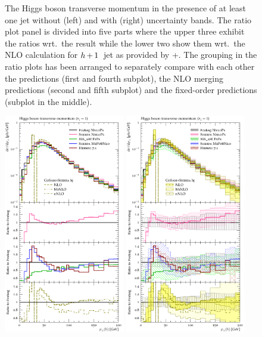 \begin{figure}[t!]
  \caption{\label{fig:hjetscomp:results:1obs:hpt}%
    The Higgs boson transverse momentum in the presence of at least
    one jet without (left) and with (right) uncertainty bands. The
    ratio plot panel is divided into five parts where the upper three
    exhibit the ratios wrt.~the \Powheg \NNLOPS result while the lower
    two show them wrt.~the NLO calculation for $h\!\text{~+~}\!1$~jet as
    provided by \GoSam+\Sherpa. The grouping in the ratio plots has
    been arranged to separately compare with each other the \NNLOPS
    predictions (first and fourth subplot), the NLO merging
    predictions (second and fifth subplot) and the fixed-order
    predictions (subplot in the middle).}
\end{figure}

\begin{figure}[t!]
  \includegraphics[width=0.47\textwidth]{figures/hjetscomp_u_H_j_pT_excl.pdf}
  \hfill
  \includegraphics[width=0.47\textwidth]{figures/hjetscomp_H_j_pT_excl.pdf}

\end{figure}
